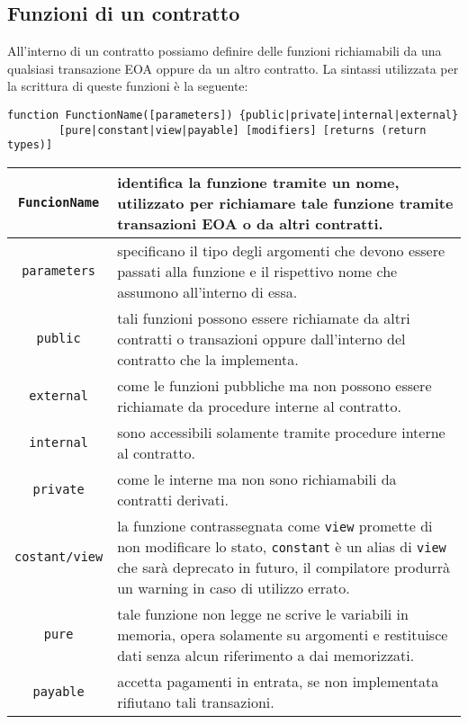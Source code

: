 \subsection{Funzioni di un contratto}
All'interno di un contratto possiamo definire delle funzioni richiamabili da una qualsiasi transazione EOA oppure da un altro contratto. La sintassi utilizzata per la scrittura di queste funzioni è la seguente:
%
\begin{lstlisting}[numbers=none,frame=none]
	function FunctionName([parameters]) {public|private|internal|external}
		[pure|constant|view|payable] [modifiers] [returns (return types)]
\end{lstlisting}
%
\begin{table}[h]
	\centering
	\begin{tabular}{|c|p{10.5cm}|}
		\hline
		\lstinline|FuncionName| & identifica la funzione tramite un nome, utilizzato per richiamare tale funzione tramite transazioni EOA o da altri contratti.\\ \hline
		\lstinline|parameters| & specificano il tipo degli argomenti che devono essere passati alla funzione e il rispettivo nome che assumono all'interno di essa.\\ \hline
		\lstinline|public| & tali funzioni possono essere richiamate da altri contratti o transazioni oppure dall'interno del contratto che la implementa.\\ \hline
		\lstinline|external| & come le funzioni pubbliche ma non possono essere richiamate da procedure interne al contratto.\\ \hline
		\lstinline|internal| & sono accessibili solamente tramite procedure interne al contratto.\\ \hline
		\lstinline|private| & come le interne ma non sono richiamabili da contratti derivati.\\ \hline
		\lstinline|costant/view| & la funzione contrassegnata come \lstinline|view| promette di non modificare lo stato, \lstinline|constant| è un alias di \lstinline|view| che sarà deprecato in futuro, il compilatore produrrà un warning in caso di utilizzo errato.\\ \hline
		\lstinline|pure| & tale funzione non legge ne scrive le variabili in memoria, opera solamente su argomenti e restituisce dati senza alcun riferimento a dai memorizzati.\\ \hline
		\lstinline|payable| & accetta pagamenti in entrata, se non implementata rifiutano tali transazioni. \\ \hline
	\end{tabular}
\end{table}
%
